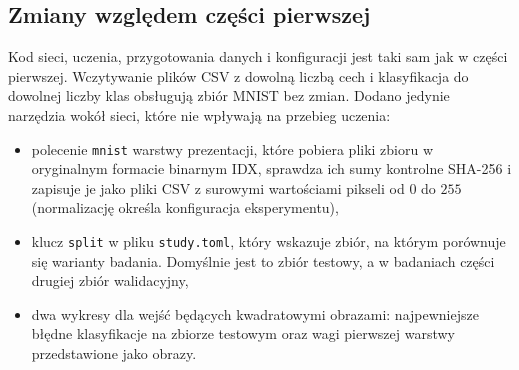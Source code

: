 \subsection{Zmiany względem części pierwszej}
\label{sec:implementation-changes}

Kod sieci, uczenia, przygotowania danych i konfiguracji jest taki sam jak w części pierwszej. Wczytywanie plików CSV z dowolną liczbą cech i klasyfikacja do dowolnej liczby klas obsługują zbiór MNIST bez zmian. Dodano jedynie narzędzia wokół sieci, które nie wpływają na przebieg uczenia:
\begin{itemize}
    \item polecenie \texttt{mnist} warstwy prezentacji, które pobiera pliki zbioru w oryginalnym formacie binarnym IDX, sprawdza ich sumy kontrolne SHA-256 i zapisuje je jako pliki CSV z surowymi wartościami pikseli od $0$ do $255$ (normalizację określa konfiguracja eksperymentu),
    \item klucz \texttt{split} w pliku \texttt{study.toml}, który wskazuje zbiór, na którym porównuje się warianty badania. Domyślnie jest to zbiór testowy, a w badaniach części drugiej zbiór walidacyjny,
    \item dwa wykresy dla wejść będących kwadratowymi obrazami: najpewniejsze błędne klasyfikacje na zbiorze testowym oraz wagi pierwszej warstwy przedstawione jako obrazy.
\end{itemize}
